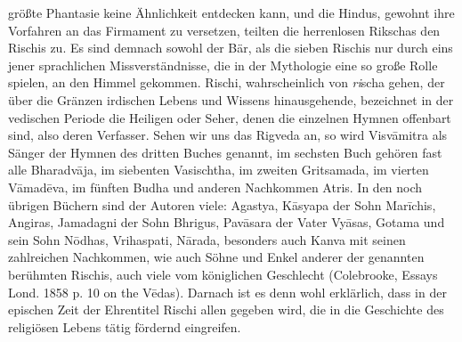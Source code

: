 \documentclass{article}
\begin{document}
größte Phantasie keine Ähnlichkeit entdecken kann, und die Hindus, gewohnt ihre Vorfahren an das Firmament zu versetzen, teilten die herrenlosen Rikschas den Rischis zu. Es sind demnach sowohl der Bär, als die sieben Rischis nur durch eins jener sprachlichen Missverständnisse, die in der Mythologie eine so große Rolle spielen, an den Himmel gekommen. Rischi, wahrscheinlich von \emph{ri}scha gehen, der über die Gränzen irdischen Lebens und Wissens hinausgehende, bezeichnet in der vedischen Periode die Heiligen oder Seher, denen die einzelnen Hymnen offenbart sind, also deren Verfasser. Sehen wir uns das Rigveda an, so wird Visv\={a}mitra als Sänger der Hymnen des dritten Buches genannt, im sechsten Buch gehören fast alle Bharadv\={a}ja, im siebenten Vasischtha, im zweiten Gritsamada, im vierten V\={a}mad\={e}va, im fünften Budha und anderen Nachkommen Atris. In den noch übrigen Büchern sind der Autoren viele: Agastya, K\={a}syapa der Sohn Mar\={i}chis, Angiras, Jamadagni der Sohn Bhrigus, Pav\={a}sara der Vater Vy\={a}sas, Gotama und sein Sohn N\={o}dhas, Vrihaspati, N\={a}rada, besonders auch Kanva mit seinen zahlreichen Nachkommen, wie auch Söhne und Enkel anderer der genannten berühmten Rischis, auch viele vom königlichen Geschlecht (Colebrooke, Essays Lond. 1858 p. 10 on the V\={e}das). Darnach ist es denn wohl erklärlich, dass in der epischen Zeit der Ehrentitel Rischi allen gegeben wird, die in die Geschichte des religiösen Lebens tätig fördernd eingreifen.
\end{document}
